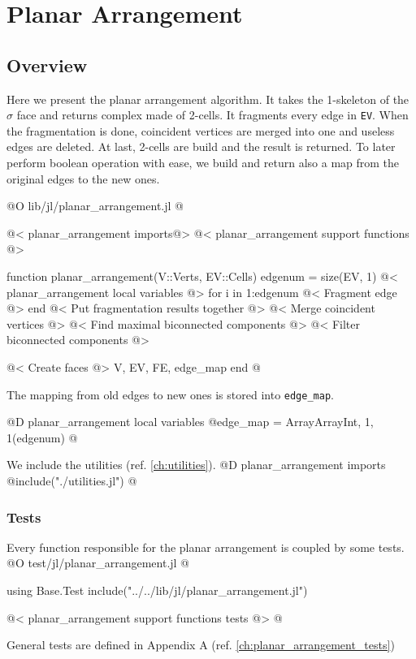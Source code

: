 \chapter{Planar Arrangement}
\label{ch:planar_arrangement}

\section{Overview}
\label{sec:planar_arrangement_overview}

Here we present the planar arrangement algorithm. It takes the 1-skeleton of the $\sigma$ face and returns complex made of 2-cells.
It fragments every edge in \texttt{EV}. 
When the fragmentation is done, coincident vertices are merged into one and useless edges are deleted. At last,
2-cells are build and the result is returned.
To later perform boolean operation with ease, we build and return also a map from the original
edges to the new ones.

@O lib/jl/planar_arrangement.jl
@{@< planar\_arrangement imports@>
@< planar\_arrangement support functions @>

function planar_arrangement(V::Verts, EV::Cells)
    edgenum = size(EV, 1)
    @< planar\_arrangement local variables @>
    for i in 1:edgenum
        @< Fragment edge @>
    end
    @< Put fragmentation results together @>
    @< Merge coincident vertices @>
    @< Find maximal biconnected components @>
    @< Filter biconnected components @>

    @< Create faces @>
    V, EV, FE, edge_map
end 
@}

The mapping from old edges to new ones is stored into \texttt{edge\_map}.

@D planar\_arrangement local variables
@{edge_map = Array{Array{Int, 1}, 1}(edgenum)
@}

We include the utilities (ref. \ref{ch:utilities}).
@D planar\_arrangement imports
@{include("./utilities.jl")
@}
\subsection{Tests}
Every function responsible for the planar arrangement is coupled by some tests. 
@O test/jl/planar_arrangement.jl
@{using Base.Test
include("../../lib/jl/planar_arrangement.jl")

@< planar\_arrangement support functions tests @>
@}
General tests are defined in Appendix A (ref. \ref{ch:planar_arrangement_tests})










